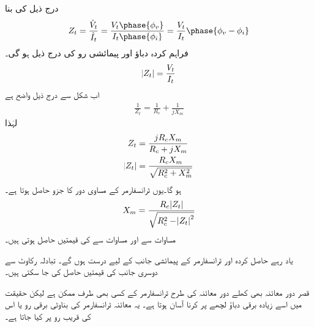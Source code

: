 درج ذیل کی بنا
\begin{align*}
Z_t=\frac{\hat{V}_t}{\hat{I}_t}=\frac{V_t\phase{\phi_v}}{I_t\phase{\phi_i}}=\frac{V_t}{I_t}\phase{\phi_v-\phi_i}
\end{align*}
فراہم کردہ دباؤ اور پیمائشی رو کی  درج ذیل ہو گی۔
\begin{align*}
\abs{Z_t}=\frac{V_t}{I_t}
\end{align*}
اب شکل   سے درج ذیل  واضح ہے
\begin{align*}
\frac{1}{Z_t}=\frac{1}{R_c}+\frac{1}{j X_m}
\end{align*}
لہٰذا
\begin{align*}
Z_t&=\frac{j R_c X_m}{R_c+j X_m}\\
\abs{Z_t}&=\frac{R_c X_m}{\sqrt{R_c^2+X_m^2}}
\end{align*}
ہو گا۔یوں ٹرانسفارمر کے مساوی دور کا جزو  حاصل ہوتا ہے۔
\begin{align}\label{مساوات_ٹرانسفارمر_کھلے_دور_امالہ_حاصل}
X_m=\frac{R_c \abs{Z_t}}{\sqrt{R_c^2-\abs{Z_t}^2}}
\end{align}
مساوات   سے  اور  مساوات   سے    کی قیمتیں حاصل ہوتی ہیں۔

یاد رہے حاصل کردہ  اور  ٹرانسفارمر کے پیمائشی جانب کے لیے درست ہوں گے۔ تبادلہ رکاوٹ سے دوسری جانب کی قیمتیں حاصل کی جا سکتی ہیں۔ 

قصر دور معائنہ بھی کھلے دور معائنہ کی طرح ٹرانسفارمر کے کسی بھی طرف ممکن  ہے لیکن حقیقت میں اسے زیادہ برقی دباؤ لچھے پر کرنا  آسان ہوتا ہے۔ یہ معائنہ  ٹرانسفارمر کی بناوٹی برقی رو  یا اس کی قریب رو پر کیا جاتا ہے۔

